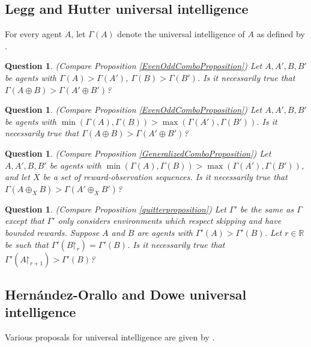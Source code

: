 \documentclass[twoside,11pt]{article}
\newtheorem{question}[theorem]{Question}
\begin{document}
\subsection{Legg and Hutter universal intelligence}

For every agent $A$, let $\varGamma(A)$ denote the universal intelligence of $A$
as defined by \citet{hutter2007}.

\begin{question}
\label{FirstOpenQuestion}
    (Compare Proposition \ref{EvenOddComboProposition})
    Let $A,A',B,B'$ be agents with $\varGamma(A)>\varGamma(A')$,
    $\varGamma(B)>\varGamma(B')$.
    Is it necessarily true that $\varGamma(A\oplus B)>\varGamma(A'\oplus B')$?
\end{question}

\begin{question}
    (Compare Proposition \ref{EvenOddComboProposition})
    Let $A,A',B,B'$ be agents
    with $\min(\varGamma(A),\varGamma(B))>\max(\varGamma(A'),\varGamma(B'))$.
    Is it necessarily true that $\varGamma(A\oplus B)>\varGamma(A'\oplus B')$?
\end{question}

\begin{question}
    (Compare Proposition \ref{GeneralizedComboProposition})
    Let $A,A',B,B'$ be agents
    with $\min(\varGamma(A),\varGamma(B))>\max(\varGamma(A'),\varGamma(B'))$,
    and let $X$ be a set of reward-observation sequences.
    Is it necessarily true that $\varGamma(A\oplus_X B)>\varGamma(A'\oplus_X B')$?
\end{question}

\begin{question}
\label{LastOpenQuestion}
    (Compare Proposition \ref{quitterproposition})
    Let $\varGamma'$ be the same as $\varGamma$ except that $\varGamma'$ only considers
    environments which respect skipping and have bounded rewards.
    Suppose $A$ and $B$ are agents with $\varGamma'(A)>\varGamma'(B)$.
    Let $r\in\mathbb R$
    be such that $\varGamma'(B\mathord{\restriction}_{r})=\varGamma'(B)$.
    Is it necessarily true that
    $\varGamma'(A\mathord{\restriction}_{r+1})>\varGamma'(B)$?
\end{question}


\subsection{Hern\'andez-Orallo and Dowe universal intelligence}

Various proposals for universal intelligence are given by \citet{hernandez}.
\end{document}
